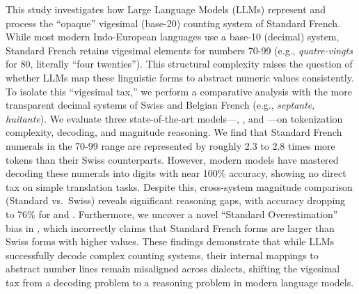 This study investigates how Large Language Models (LLMs) represent and process the ``opaque'' vigesimal (base-20) counting system of Standard French. While most modern Indo-European languages use a base-10 (decimal) system, Standard French retains vigesimal elements for numbers 70-99 (e.g., \textit{quatre-vingts} for 80, literally ``four twenties''). This structural complexity raises the question of whether LLMs map these linguistic forms to abstract numeric values consistently. To isolate this ``vigesimal tax,'' we perform a comparative analysis with the more transparent decimal systems of Swiss and Belgian French (e.g., \textit{septante}, \textit{huitante}). We evaluate three state-of-the-art models---\gpt, \claude, and \llama---on tokenization complexity, decoding, and magnitude reasoning. We find that Standard French numerals in the 70-99 range are represented by roughly 2.3 to 2.8 times more tokens than their Swiss counterparts. However, modern models have mastered decoding these numerals into digits with near 100\% accuracy, showing no direct tax on simple translation tasks. Despite this, cross-system magnitude comparison (Standard vs.\ Swiss) reveals significant reasoning gaps, with accuracy dropping to 76\% for \claude and \llama. Furthermore, we uncover a novel ``Standard Overestimation'' bias in \claude, which incorrectly claims that Standard French forms are larger than Swiss forms with higher values. These findings demonstrate that while LLMs successfully decode complex counting systems, their internal mappings to abstract number lines remain misaligned across dialects, shifting the vigesimal tax from a decoding problem to a reasoning problem in modern language models.
